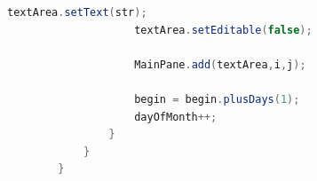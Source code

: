 \documentclass[a4paper]{article}
\begin{document}
\begin{lstlisting}[language=Java]
                    textArea.setText(str);
                    textArea.setEditable(false);

                    MainPane.add(textArea,i,j);

                    begin = begin.plusDays(1);
                    dayOfMonth++;
                }
            }
        }
    \end{lstlisting}
\end{document}
